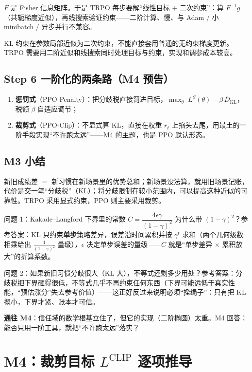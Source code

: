 \documentclass[UTF8,12pt,a4paper]{ctexrep}
\newcommand{\plain}[1]{\begin{plainbox}#1\end{plainbox}}
\newcommand{\pin}[1]{\begin{pinbox}#1\end{pinbox}}
\newcommand{\selfcheck}[1]{\begin{checkb}#1\end{checkb}}
\begin{document}
$F$ 是 Fisher 信息矩阵。于是 TRPO 每步要解``线性目标 $+$ 二次约束''：算 $F^{-1}g$（共轭梯度近似），再线搜索验证约束——二阶计算、慢、与 Adam / 小 minibatch / 异步并行不兼容。

\plain{KL 约束在参数局部近似为二次约束，不能直接套用普通的无约束梯度更新。TRPO 需要用二阶近似和线搜索同时处理目标与约束，实现和调参成本较高。}

\subsection*{Step 6 \; 一阶化的两条路（M4 预告）}

\begin{enumerate}[nosep]
  \item \textbf{惩罚式}（PPO-Penalty）：把分歧税直接罚进目标，$\max_\theta\; L^{S}(\theta) - \beta\, \bar{D}_{\mathrm{KL}}$，税额 $\beta$ 自适应调节；
  \item \textbf{裁剪式}（PPO-Clip）：不显式算 KL，直接在权重 $r_t$ 上掐头去尾，用最土的一阶手段实现``不许跑太远''——M4 的主题，也是 PPO 默认形态。
\end{enumerate}

\subsection*{M3 小结}

\pin{新旧成绩差 $=$ 新习惯在新场景里的优势总和；新场景没法算，就用旧场景记账，代价是交一笔``分歧税''（KL）；将分歧限制在较小范围内，可以提高这种近似的可靠性。TRPO 采用显式约束，PPO 则主要采用裁剪。}

\selfcheck{问题 1：Kakade--Langford 下界里的常数 $C=\dfrac{4\epsilon\gamma}{(1-\gamma)^2}$ 为什么带 $(1-\gamma)^2$？\quad 参考答案：KL 只约束\textbf{单步}策略差异，误差沿时间累积并按 $\gamma^t$ 求和（两个几何级数相乘给出 $\frac{1}{(1-\gamma)^2}$ 量级），$\epsilon$ 决定单步误差的量级——$C$ 就是``单步差异 $\times$ 累积放大''的折算系数。}

\selfcheck{问题 2：如果新旧习惯分歧很大（KL 大），不等式还剩多少用处？\quad 参考答案：分歧税把下界砸得很低，不等式几乎不再约束任何东西（下界可能远低于真实性能，``预估涨分''失去参考价值）——这正好反过来说明必须``拴绳子''：只有把 KL 摁小，下界才紧、账本才可信。}

\textbf{通往 M4}：信任域的数学根基立住了，但它的实现（二阶椭圆）太重。M4 回答：能否只用一阶工具，就把``不许跑太远''落实？

\section{M4：裁剪目标 $L^{\mathrm{CLIP}}$ 逐项推导}
\end{document}
